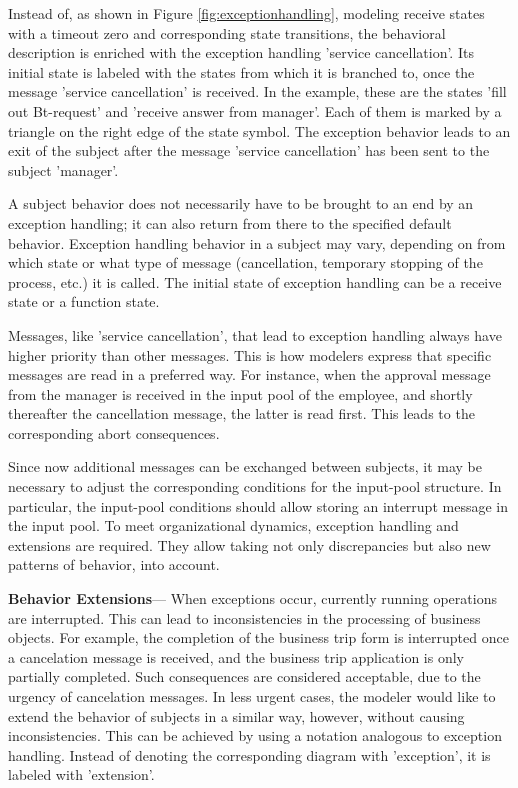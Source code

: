 Instead of, as shown in Figure \ref{fig:exceptionhandling}, modeling receive states with a timeout zero and corresponding state transitions, the behavioral description is enriched with the exception handling 'service cancellation'. Its initial state is labeled with the states from which it is branched to, once the message 'service cancellation' is received. In the example, these are the states 'fill out Bt-request' and 'receive answer from manager'. Each of them is marked by a triangle on the right edge of the state symbol. The exception behavior leads to an exit of the subject after the message 'service cancellation' has been sent to the subject 'manager'.

A subject behavior does not necessarily have to be brought to an end by an exception handling; it can also return from there to the specified default behavior. Exception handling behavior in a subject may vary, depending on from which state or what type of message (cancellation, temporary stopping of the process, etc.) it is called. The initial state of exception handling can be a receive state or a function state.

Messages, like 'service cancellation', that lead to exception handling always have higher priority than other messages. This is how modelers express that specific messages are read in a preferred way. For instance, when the approval message from the manager is received in the input pool of the employee, and shortly thereafter the cancellation message, the latter is read first. This leads to the corresponding abort consequences.

Since now additional messages can be exchanged between subjects, it may be necessary to adjust the corresponding conditions for the input-pool structure. In particular, the input-pool conditions should allow storing an interrupt message in the input pool. To meet organizational dynamics, exception handling and extensions are required. They allow taking not only discrepancies but also new patterns of behavior, into account.

\textbf{Behavior Extensions}---
When exceptions occur, currently running operations are interrupted. This can lead to inconsistencies in the processing of business objects. For example, the completion of the business trip form is interrupted once a cancelation message is received, and the business trip application is only partially completed. Such consequences are considered acceptable, due to the urgency of cancelation messages. In less urgent cases, the modeler would like to extend the behavior of subjects in a similar way, however, without causing inconsistencies. This can be achieved by using a notation analogous to exception handling. Instead of denoting the corresponding diagram with 'exception', it is labeled with 'extension'.

